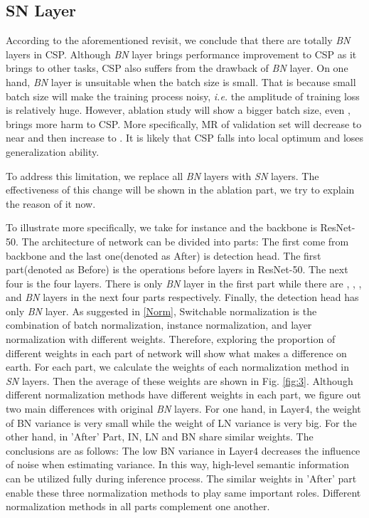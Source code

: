 \documentclass[twocolumn]{article}
\begin{document}
\subsection{SN Layer}\label{SN}
According to the aforementioned revisit, we conclude that there are totally  \textit{BN} layers in CSP\cite{liu2019high}. Although  \textit{BN} layer brings performance improvement to CSP\cite{liu2019high} as it brings to other tasks,  CSP\cite{liu2019high} also suffers from the drawback of  \textit{BN} layer. On one hand, \textit{BN} layer is unsuitable when the batch size is small. That is because small batch size will make the training process noisy, \textit{i.e.} the amplitude of training loss is relatively huge. However, ablation study will show a bigger batch size, even , brings more harm to CSP\cite{liu2019high}. More specifically, MR of validation set will decrease to near  and then increase to . It is likely that CSP\cite{liu2019high} falls into local optimum and loses generalization ability.\par 
To address this limitation, we replace all \textit{BN} layers with \textit{SN} layers. The effectiveness of this change will be shown in the ablation part, we try to explain the reason of it now.\par To illustrate more specifically, we take  for instance and the backbone is ResNet-50. The architecture of network can be divided into  parts: The first  come from backbone and the last one(denoted as After) is detection head. The first part(denoted as Before) is the operations before  layers in ResNet-50. The next four is the four layers. There is only  \textit{BN} layer in the first part while there are , , , and  \textit{BN} layers in the next four parts respectively. Finally, the detection head has only  \textit{BN} layer. As suggested in \ref{Norm}, Switchable normalization is the combination of batch normalization, instance normalization, and layer normalization with different weights. Therefore, exploring the proportion of different weights in each part of network will show what makes a difference on earth. For each part, we calculate the weights of each normalization method in \textit{SN} layers. Then the average of these weights are shown in Fig. \ref{fig:3}. Although different normalization methods have different weights in each part, we figure out two main differences with original \textit{BN} layers. For one hand, in Layer4, the weight of BN variance is very small while the weight of LN variance is very big. For the other hand, in 'After' Part, IN, LN and BN share similar weights. The conclusions are as follows:  The low BN variance in Layer4 decreases the influence of noise when estimating variance. In this way, high-level semantic information can be utilized fully during inference process.  The similar weights in 'After' part enable these three normalization methods to play same important roles.  Different normalization methods in all parts complement one another.
\end{document}
